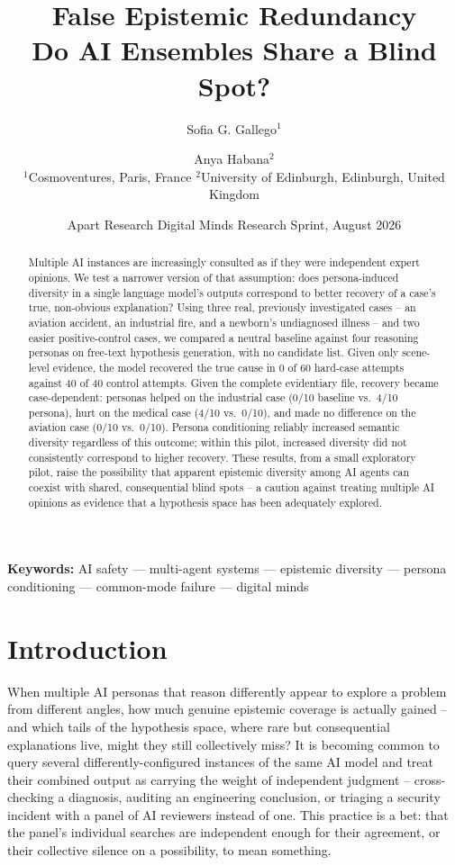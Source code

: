 \documentclass[11pt]{article}
\title{\textbf{False Epistemic Redundancy}\\
\large Do AI Ensembles Share a Blind Spot?}
\author{
Sofia G. Gallego$^{1}$ \and Anya Habana$^{2}$ \\[4pt]
\normalsize $^1$Cosmoventures, Paris, France \quad $^2$University of Edinburgh, Edinburgh, United Kingdom
}
\date{Apart Research Digital Minds Research Sprint, August 2026}
\begin{document}
\maketitle

\begin{abstract}
Multiple AI instances are increasingly consulted as if they were independent
expert opinions. We test a narrower version of that assumption: does
persona-induced diversity in a single language model's outputs correspond to
better recovery of a case's true, non-obvious explanation? Using three real,
previously investigated cases -- an aviation accident, an industrial fire,
and a newborn's undiagnosed illness -- and two easier positive-control
cases, we compared a neutral baseline against four reasoning personas on
free-text hypothesis generation, with no candidate list. Given only
scene-level evidence, the model recovered the true cause in 0 of 60
hard-case attempts against 40 of 40 control attempts. Given the complete
evidentiary file, recovery became case-dependent: personas helped on the
industrial case (0/10 baseline vs.\ 4/10 persona), hurt on the medical case
(4/10 vs.\ 0/10), and made no difference on the aviation case (0/10 vs.\
0/10). Persona conditioning reliably increased semantic diversity regardless
of this outcome; within this pilot, increased diversity did not consistently
correspond to higher recovery. These results, from a small exploratory
pilot, raise the possibility that apparent epistemic diversity among AI
agents can coexist with shared, consequential blind spots -- a caution
against treating multiple AI opinions as evidence that a hypothesis space
has been adequately explored.
\end{abstract}

\noindent\textbf{Keywords:} AI safety --- multi-agent systems --- epistemic diversity --- persona conditioning --- common-mode failure --- digital minds

\section{Introduction}

When multiple AI personas that reason differently appear to explore a
problem from different angles, how much genuine epistemic coverage is
actually gained -- and which tails of the hypothesis space, where rare but
consequential explanations live, might they still collectively miss? It is
becoming common to query several differently-configured instances of the
same AI model and treat their combined output as carrying the weight of
independent judgment -- cross-checking a diagnosis, auditing an
engineering conclusion, or triaging a security incident with a panel of AI
reviewers instead of one. This practice is a bet: that the panel's
individual searches are independent enough for their agreement, or their
collective silence on a possibility, to mean something.
\end{document}
